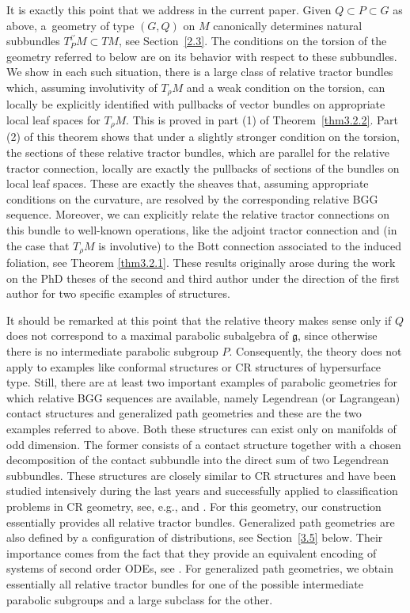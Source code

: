\documentclass[pdftex]{sigma}
\numberwithin{equation}{section}
\def\frak{\mathfrak}
\begin{document}
It is exactly this point that we address in the current paper. Given
 $Q\subset P\subset G$ as above, a~geometry of type $(G,Q)$ on $M$ canonically
 determines natural subbundles $T^{i'}_PM\subset TM$, see Section~\ref{2.3}. The
 conditions on the torsion of the geometry referred to below are on its behavior
 with respect to these subbundles. We show in each such situation, there is a large
 class of relative tractor bundles which, assuming involutivity of $T_\rho M$ and a
 weak condition on the torsion, can locally be explicitly identified with pullbacks
 of vector bundles on appropriate local leaf spaces for $T_\rho M$. This is proved
 in part (1) of Theorem~\ref{thm3.2.2}. Part (2) of this theorem shows that under a
 slightly stronger condition on the torsion, the sections of these relative tractor
 bundles, which are parallel for the relative tractor connection, locally are exactly the pullbacks of sections of the bundles on local leaf spaces.
These are exactly the sheaves that, assuming appropriate conditions on the curvature,
are resolved by the corresponding relative BGG sequence. Moreover, we can explicitly
relate the relative tractor connections on this bundle to well-known operations, like
the adjoint tractor connection and \big(in the case that $T_\rho M$ is involutive\big) to the
Bott connection associated to the induced foliation, see Theorem
 \ref{thm3.2.1}. These results originally arose during the work on the PhD theses
of the second and third author under the direction of the first author for two
specific examples of structures.

It should be remarked at this point that the relative theory makes sense only if $Q$
does not correspond to a maximal parabolic subalgebra of $\frak g$, since otherwise
there is no intermediate parabolic subgroup $P$. Consequently, the theory does not
apply to examples like conformal structures or CR structures of hypersurface
type. Still, there are at least two important examples of parabolic geometries for
which relative BGG sequences are available, namely Legendrean (or Lagrangean) contact
structures and generalized path geometries and these are the two examples referred to
above. Both these structures can exist only on manifolds of odd dimension. The former
consists of a contact structure together with a chosen decomposition of the contact
subbundle into the direct sum of two Legendrean subbundles. These structures are
closely similar to CR structures and have been studied intensively during the last
years and successfully applied to classification problems in CR geometry, see, e.g.,
\cite{Doubrov-Medvedev-The,Doubrov-Merker-The} and \cite{MFMZ}. For this
geometry, our construction essentially provides all relative tractor
bundles. Generalized path geometries are also defined by a configuration of
distributions, see Section~\ref{3.5} below. Their importance comes from the fact that they
provide an equivalent encoding of systems of second order ODEs, see \cite{Fels}. For
generalized path geometries, we obtain essentially all relative tractor bundles for
one of the possible intermediate parabolic subgroups and a large subclass for the
other.
\end{document}
